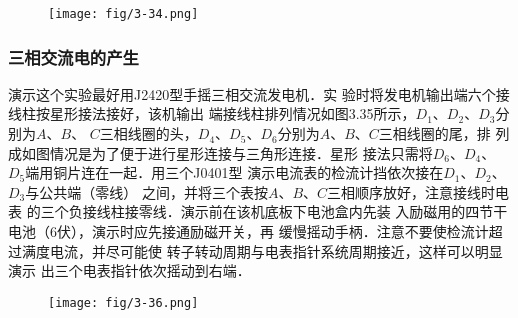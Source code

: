 \begin{figure}[htp]
    \centering
\texttt{[image: fig/3-34.png]}
    \caption{}
\end{figure}

\subsubsection{三相交流电的产生}

\begin{figure}[htp]
    \centering
{}
    \caption{}
\end{figure}

演示这个实验最好用J2420型手摇三相交流发电机．实
验时将发电机输出端六个接线柱按星形接法接好，该机输出
端接线柱排列情况如图3.35所示，$D_1$、$D_2$、$D_3$分别为$A$、$B$、
$C$三相线圈的头，$D_4$、$D_5$、$D_6$分别为$A$、$B$、$C$三相线圈的尾，排
列成如图情况是为了便于进行星形连接与三角形连接．星形
接法只需将$D_6$、$D_4$、$D_5$端用铜片连在一起．用三个J0401型
演示电流表的检流计挡依次接在$D_1$、$D_2$、$D_3$与公共端（零线）
之间，并将三个表按$A$、$B$、$C$三相顺序放好，注意接线时电表
的三个负接线柱接零线．演示前在该机底板下电池盒内先装
入励磁用的四节干电池（6伏），演示时应先接通励磁开关，再
缓慢摇动手柄．注意不要使检流计超过满度电流，并尽可能使
转子转动周期与电表指针系统周期接近，这样可以明显演示
出三个电表指针依次摇动到右端．

\begin{figure}[htp]
    \centering
\texttt{[image: fig/3-36.png]}
    \caption{}
\end{figure}

